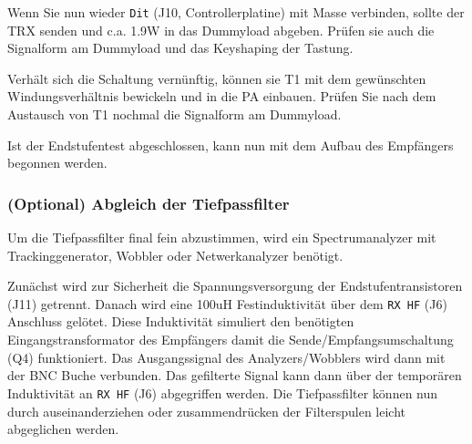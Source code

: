 \documentclass[10pt, a4paper]{paper}
\newcommand{\con}[1]{\texttt{#1}}
\begin{document}
Wenn Sie nun wieder \con{Dit} (J10, Controllerplatine) mit Masse verbinden, sollte der TRX senden und c.a. 1.9W in das Dummyload abgeben.  Prüfen sie auch die Signalform am Dummyload und das Keyshaping der Tastung.

Verhält sich die Schaltung vernünftig, können sie T1 mit dem gewünschten Windungsverhältnis bewickeln und in die PA einbauen. Prüfen Sie nach dem Austausch von T1 nochmal die Signalform am Dummyload. 

Ist der Endstufentest abgeschlossen, kann nun mit dem Aufbau des Empfängers begonnen werden. 
 
\subsubsection{(Optional) Abgleich der Tiefpassfilter}
Um die Tiefpassfilter final fein abzustimmen, wird ein Spectrumanalyzer mit Trackinggenerator, Wobbler oder Netwerkanalyzer benötigt. 

Zunächst wird zur Sicherheit die Spannungsversorgung der Endstufentransistoren (J11) getrennt. Danach wird eine 100uH Festinduktivität über dem \con{RX HF} (J6) Anschluss gelötet. Diese Induktivität simuliert den benötigten Eingangstransformator des Empfängers damit die Sen\-de/Emp\-fangs\-um\-schal\-tung (Q4) funktioniert. Das Ausgangssignal des Analyzers/Wobblers wird dann mit der BNC Buche verbunden. Das gefilterte Signal kann dann über der temporären Induktivität an \con{RX HF} (J6) abgegriffen werden. Die Tiefpassfilter können nun durch auseinanderziehen oder zusammendrücken der Filterspulen leicht abgeglichen werden. 

\clearpage
\end{document}
